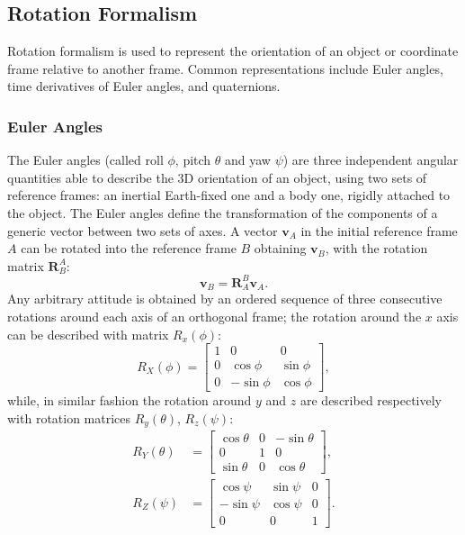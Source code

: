 \subsection{Rotation Formalism}

Rotation formalism is used to represent the orientation of an object or coordinate frame relative to another frame. Common representations include Euler angles, time derivatives of Euler angles, and quaternions.

\subsubsection{Euler Angles}
The Euler angles (called roll \(\phi\), pitch \(\theta\) and yaw \(\psi\)) are three independent angular quantities able to describe the 3D orientation of an object, using two sets of reference frames: an inertial Earth-fixed one and a body one, rigidly attached to the object. The Euler angles define the transformation of the components of a generic vector between two sets of axes. A vector \(\mathbf{v}_A\) in the initial reference frame \(A\) can be rotated into the reference frame \(B\) obtaining \(\mathbf{v}_B\), with the rotation matrix \(\mathbf{R}_{B}^{A}\):
\begin{equation}
    \mathbf{v}_B = \mathbf{R}_{A}^{B} \mathbf{v}_A. \label{eq:rotation_matrix}
\end{equation}
Any arbitrary attitude is obtained by an ordered sequence of three consecutive rotations around each axis of an orthogonal frame; the rotation around the \(x\) axis can be described with matrix \(R_x(\phi)\):
\begin{equation}
    R_X(\phi) = \begin{bmatrix} 
        1 & 0 & 0 \\ 
        0 & \cos \phi & \sin \phi \\ 
        0 & -\sin \phi & \cos \phi 
    \end{bmatrix}, \label{eq:rotation_x}
\end{equation}
while, in similar fashion the rotation around \(y\) and \(z\) are described respectively with rotation matrices \(R_y(\theta)\), \(R_z(\psi)\):
\begin{align}
    R_Y(\theta) &= \begin{bmatrix} 
        \cos \theta & 0 & -\sin \theta \\ 
        0 & 1 & 0 \\ 
        \sin \theta & 0 & \cos \theta 
    \end{bmatrix}, \label{eq:rotation_y} \\
    R_Z(\psi) &= \begin{bmatrix} 
        \cos \psi & \sin \psi & 0 \\ 
        -\sin \psi & \cos \psi & 0 \\ 
        0 & 0 & 1 
    \end{bmatrix}. \label{eq:rotation_z}
\end{align}
